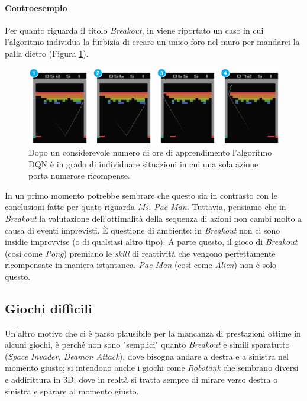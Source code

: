 \documentclass[twoside,twocolumn,10pt]{extarticle}
\theoremstyle{definition}
\begin{document}
		\paragraph*{Controesempio} Per quanto riguarda il titolo \textit{Breakout}, in \cite{bib:dqn} viene riportato un caso in cui l'algoritmo individua la furbizia di creare un unico foro nel muro per mandarci la palla dietro (Figura \ref{fig:breakout}).		
		\begin{figure}[h]
			\centering
			\includegraphics[scale=.65]{images/breakout.png}
			\caption{Dopo un considerevole numero di ore di apprendimento l'algoritmo DQN è in grado di individuare situazioni in cui una sola azione porta numerose ricompense.}
			\label{fig:breakout}
		\end{figure} 
		In un primo momento potrebbe sembrare che questo sia in contrasto con le conclusioni fatte per quato riguarda \textit{Ms. Pac-Man}. Tuttavia, pensiamo che in \textit{Breakout} la valutazione dell'ottimalità della sequenza di azioni non cambi molto a causa di eventi imprevisti. È questione di ambiente: in \textit{Breakout} non ci sono insidie improvvise (o di qualsiasi altro tipo). A parte questo, il gioco di \textit{Breakout} (così come \textit{Pong}) premiano le \textit{skill} di reattività che vengono perfettamente ricompensate in maniera istantanea. \textit{Pac-Man} (così come \textit{Alien}) non è solo questo.
	
	\subsection{Giochi difficili}
		Un'altro motivo che ci è parso plausibile per la mancanza di prestazioni ottime in alcuni giochi, è perché non sono "semplici" quanto \textit{Breakout} e simili sparatutto (\textit{Space Invader, Deamon Attack}), dove bisogna andare a destra e a sinistra nel momento giusto; si intendono anche i giochi come \textit{Robotank} che sembrano diversi e addirittura in 3D, dove in realtà si tratta sempre di mirare verso destra o sinistra e sparare al momento giusto.
		
\end{document}
